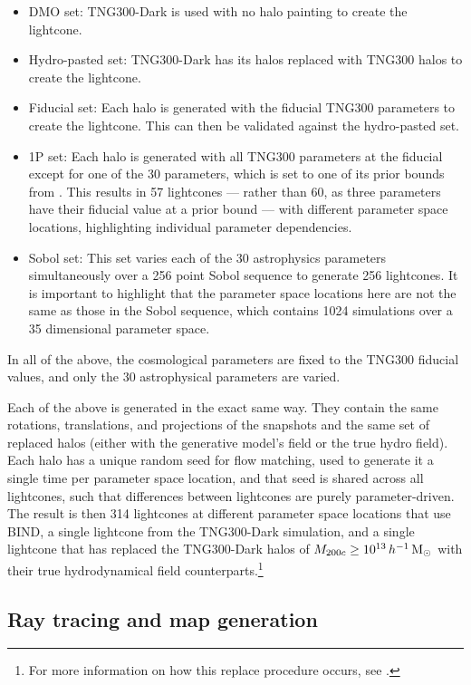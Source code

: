 \documentclass[linenumbers,trackchanges, twocolumn]{aastex701}
\begin{document}
\begin{itemize}
\item DMO set: TNG300-Dark is used with no halo painting to create the lightcone.
\item Hydro-pasted set: TNG300-Dark has its halos replaced with TNG300 halos to create the lightcone.
\item Fiducial set: Each halo is generated with the fiducial TNG300 parameters to create the lightcone. This can then be validated against the hydro-pasted set.
\item 1P set: Each halo is generated with all TNG300 parameters at the fiducial except for one of the 30 parameters, which is set to one of its prior bounds from \citet{Genel-2026}. This results in 57 lightcones --- rather than 60, as three parameters have their fiducial value at a prior bound --- with different parameter space locations, highlighting individual parameter dependencies.
\item Sobol set: This set varies each of the 30 astrophysics parameters simultaneously over a 256 point Sobol sequence to generate 256 lightcones. It is important to highlight that the parameter space locations here are not the same as those in the \citet{Genel-2026} Sobol sequence, which contains 1024 simulations over a 35 dimensional parameter space.
\end{itemize}

 
In all of the above, the cosmological parameters are fixed to the TNG300 fiducial values, and only the 30 astrophysical parameters are varied.
 
Each of the above is generated in the exact same way. They contain the same rotations, translations, and projections of the snapshots and the same set of replaced halos (either with the generative model's field or the true hydro field). Each halo has a unique random seed for flow matching, used to generate it a single time per parameter space location, and that seed is shared across all lightcones, such that differences between lightcones are purely parameter-driven. The result is then 314 lightcones at different parameter space locations that use BIND, a single lightcone from the TNG300-Dark simulation, and a single lightcone that has replaced the TNG300-Dark halos of $M_{200c}\geq 10^{13}\,h^{-1}\,{\rm M}_\odot$ with their true hydrodynamical field counterparts.\footnote{For more information on how this replace procedure occurs, see \citet{Lee-2026a}.}

 
\subsection{Ray tracing and map generation}\label{sec:raytracing}
\end{document}
